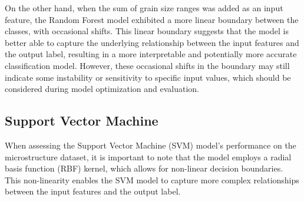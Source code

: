\documentclass[10pt]{article}
\begin{document}
\begin{multicols}{2}
On the other hand, when the sum of grain size ranges was added as an input feature, the Random Forest model exhibited a more linear boundary between the classes, with occasional shifts. This linear boundary suggests that the model is better able to capture the underlying relationship between the input features and the output label, resulting in a more interpretable and potentially more accurate classification model. However, these occasional shifts in the boundary may still indicate some instability or sensitivity to specific input values, which should be considered during model optimization and evaluation.

\subsection{Support Vector Machine}

When assessing the Support Vector Machine (SVM) model's performance on the microstructure dataset, it is important to note that the model employs a radial basis function (RBF) kernel, which allows for non-linear decision boundaries. This non-linearity enables the SVM model to capture more complex relationships between the input features and the output label.


\end{multicols}
\end{document}
